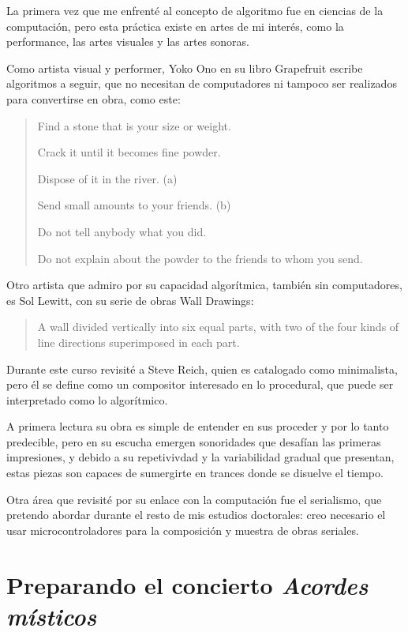 \documentclass{article}
\begin{document}
La primera vez que me enfrenté al concepto de algoritmo fue en ciencias de la computación, pero esta práctica existe en artes de mi interés, como la performance, las artes visuales y las artes sonoras.

Como artista visual y performer, Yoko Ono en su libro Grapefruit escribe algoritmos a seguir, que no necesitan de computadores ni tampoco ser realizados para convertirse en obra, como este:

\begin{quote}
  Find a stone that is your size or weight.
  
  Crack it until it becomes fine powder.
  
  Dispose of it in the river. (a)

  Send small amounts to your friends. (b)

  Do not tell anybody what you did.

  Do not explain about the powder to the friends to whom you send.\cite{grapefruitYokoOno}
\end{quote}

Otro artista que admiro por su capacidad algorítmica, también sin computadores, es Sol Lewitt, con su serie de obras Wall Drawings:

\begin{quote}
    A wall divided vertically into six equal parts, with two of the four kinds of line directions superimposed in each part.\cite{wallDrawingsSolLewitt}
\end{quote}

Durante este curso revisité a Steve Reich, quien es catalogado como minimalista, pero él se define como un compositor interesado en lo procedural, que puede ser interpretado como lo algorítmico.

A primera lectura su obra es simple de entender en sus proceder y por lo tanto predecible, pero en su escucha emergen sonoridades que desafían las primeras impresiones, y debido a su repetivivdad y la variabilidad gradual que presentan, estas piezas son capaces de sumergirte en trances donde se disuelve el tiempo.

Otra área que revisité por su enlace con la computación fue el serialismo, que pretendo abordar durante el resto de mis estudios doctorales: creo necesario el usar microcontroladores para la composición y muestra de obras seriales.

\clearpage

\section{Preparando el concierto \textit{Acordes místicos}}
\end{document}
